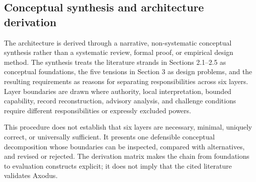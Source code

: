 \documentclass[11pt]{article}
\begin{document}
\subsection{Conceptual synthesis and architecture derivation}

The architecture is derived through a narrative, non-systematic conceptual
synthesis rather than a systematic review, formal proof, or empirical design
method. The synthesis treats the literature strands in Sections 2.1--2.5 as
conceptual foundations, the five tensions in Section 3 as design problems, and
the resulting requirements as reasons for separating responsibilities across
six layers. Layer boundaries are drawn where authority, local interpretation,
bounded capability, record reconstruction, advisory analysis, and challenge
conditions require different responsibilities or expressly excluded powers.

This procedure does not establish that six layers are necessary, minimal,
uniquely correct, or universally sufficient. It presents one defensible
conceptual decomposition whose boundaries can be inspected, compared with
alternatives, and revised or rejected. The derivation matrix makes the chain
from foundations to evaluation constructs explicit; it does not imply that
the cited literature validates Axodus.
\end{document}
